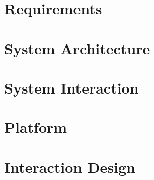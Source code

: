 
\chapter{Requirements}

\chapter{System Architecture}



\chapter{System Interaction}

\chapter{Platform}


\chapter{Interaction Design}
